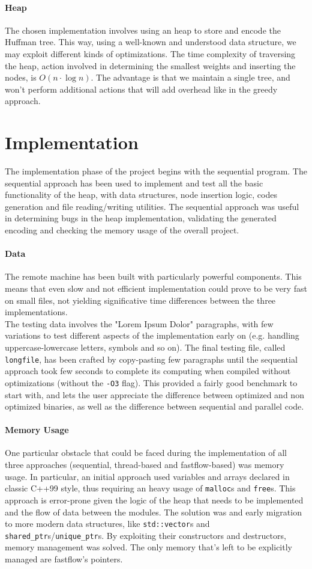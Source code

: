 \documentclass[10pt]{article}
\begin{document}
\paragraph{Heap} The chosen implementation involves using an heap to store and encode the Huffman tree. This way, using a well-known and understood data structure, we may exploit different kinds of optimizations. The time complexity of traversing the heap, action involved in determining the smallest weights and inserting the nodes, is $O(n\cdot\log n)$. The advantage is that we maintain a single tree, and won't perform additional actions that will add overhead like in the greedy approach.
\section{Implementation}
The implementation phase of the project begins with the sequential program. The sequential approach has been used to implement and test all the basic functionality of the heap, with data structures, node insertion logic, codes generation and file reading/writing utilities. The sequential approach was useful in determining bugs in the heap implementation, validating the generated encoding and checking the memory usage of the overall project.
\paragraph{Data} The remote machine has been built with particularly powerful components. This means that even slow and not efficient implementation could prove to be very fast on small files, not yielding significative time differences between the three implementations.\\
The testing data involves the "Lorem Ipsum Dolor" paragraphs, with few variations to test different aspects of the implementation early on (e.g. handling uppercase-lowercase letters, symbols and so on). The final testing file, called \texttt{longfile}, has been crafted by copy-pasting few paragraphs until the sequential approach took few seconds to complete its computing when compiled without optimizations (without the \texttt{-O3} flag). This provided a fairly good benchmark to start with, and lets the user appreciate the difference between optimized and non optimized binaries, as well as the difference between sequential and parallel code.
\paragraph{Memory Usage} One particular obstacle that could be faced during the implementation of all three approaches (sequential, thread-based and fastflow-based) was memory usage. In particular, an initial approach used variables and arrays declared in classic C++99 style, thus requiring an heavy usage of \texttt{malloc}s and \texttt{free}s. This approach is error-prone given the logic of the heap that needs to be implemented and the flow of data between the modules. The solution was and early migration to more modern data structures, like \texttt{std::vector}s and \texttt{shared\_ptr}s/\texttt{unique\_ptr}s. By exploiting their constructors and destructors, memory management was solved. The only memory that's left to be explicitly managed are fastflow's pointers.
\end{document}
